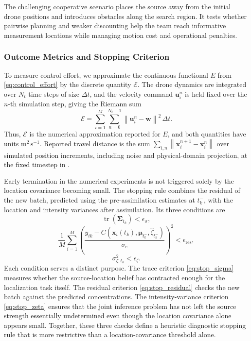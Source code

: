 \documentclass{article}
\DeclareMathOperator{\tr}{tr}
\newcommand{\norm}[1]{\left\|#1\right\|}
\newcommand{\bs}[1]{\boldsymbol{#1}}
\newcommand{\x}{\mathbf{x}}
\renewcommand{\u}{\mathbf{u}}
\begin{document}
The challenging cooperative scenario places the source away from the initial drone positions and introduces obstacles along the search region.
It tests whether pairwise planning and weaker discounting help the team reach informative measurement locations while managing motion cost and operational penalties.

\subsubsection{Outcome Metrics and Stopping Criterion}
\label{sec:stopping_criterion}

To measure control effort, we approximate the continuous functional $E$ from \eqref{eq:control_effort} by the discrete quantity $\mathcal E$.
The drone dynamics are integrated over $N_t$ time steps of size $\Delta t$, and the velocity command $\u_i^n$ is held fixed over the $n$-th simulation step, giving the Riemann sum
\begin{equation}
\mathcal{E} = \sum_{i=1}^M \sum_{n=0}^{N_t-1} \norm{\u_i^n-\bs w}^2\,\Delta t.
\end{equation}
Thus, $\mathcal E$ is the numerical approximation reported for $E$, and both quantities have units $\mathrm{m^2\,s^{-1}}$.
Reported travel distance is the sum $\sum_{i,n}\norm{\x_i^{n+1}-\x_i^n}$ over simulated position increments, including noise and physical-domain projection, at the fixed timestep in .

Early termination in the numerical experiments is not triggered solely by the location covariance becoming small.
The stopping rule combines the residual of the new batch, predicted using the pre-assimilation estimates at $t_k^-$, with the location and intensity variances after assimilation.
Its three conditions are
\begin{equation}
\label{eq:stop_sigma}
\tr(\bs\Sigma_{t_k}) < \epsilon_\sigma,
\end{equation}
\begin{equation}
\label{eq:stop_residual}
\frac{1}{M}\sum_{i=1}^M
\left(
\frac{y_{ik}-C(\x_i(t_k),\bs\mu_{t_k^-},\hat\zeta_{t_k^-})}{\sigma_e}
\right)^2
< \epsilon_{\mathrm{res}},
\end{equation}
\begin{equation}
\label{eq:stop_zeta}
\sigma_{\zeta,t_k}^2 < \epsilon_\zeta.
\end{equation}
Each condition serves a distinct purpose.
The trace criterion \eqref{eq:stop_sigma} measures whether the source-location belief has contracted enough for the localization task itself.
The residual criterion \eqref{eq:stop_residual} checks the new batch against the predicted concentrations.
The intensity-variance criterion \eqref{eq:stop_zeta} ensures that the joint inference problem has not left the source strength essentially undetermined even though the location covariance alone appears small.
Together, these three checks define a heuristic diagnostic stopping rule that is more restrictive than a location-covariance threshold alone.
\end{document}
